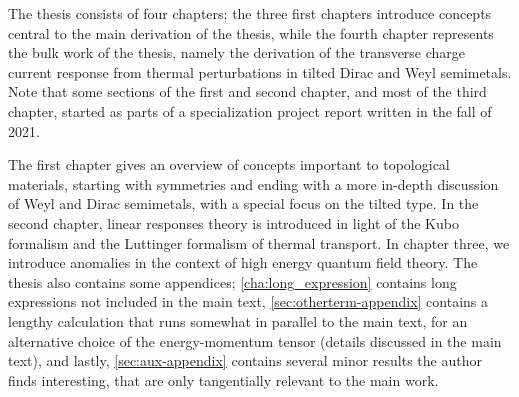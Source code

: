 The thesis consists of four chapters;
the three first chapters introduce concepts central to the main derivation of the thesis, while the fourth chapter represents the bulk work of the thesis, namely the derivation of the transverse charge current response from thermal perturbations in tilted Dirac and Weyl semimetals.
Note that some sections of the first and second chapter, and most of the third chapter, started as parts of a specialization project report written in the fall of 2021.

The first chapter gives an overview of concepts important to topological materials, starting with symmetries and ending with a more in-depth discussion of Weyl and Dirac semimetals, with a special focus on the tilted type.
In the second chapter, linear responses theory is introduced in light of the Kubo formalism and the Luttinger formalism of thermal transport.
In chapter three, we introduce anomalies in the context of high energy quantum field theory.
The thesis also contains some appendices;
\cref{cha:long_expression} contains long expressions not included in the main text, \cref{sec:otherterm-appendix} contains a lengthy calculation that runs somewhat in parallel to the main text, for an alternative choice of the energy-momentum tensor (details discussed in the main text), and lastly, \cref{sec:aux-appendix} contains several minor results the author finds interesting, that are only tangentially relevant to the main work.


